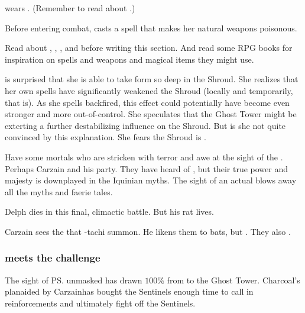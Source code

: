 \Nzessuacrith{} wears . 
(Remember to read about .)

Before entering combat, \Nzessuacrith{} casts a spell that makes her natural weapons poisonous. 

Read about , , ,  and  before writing this section. 
And read some RPG books for inspiration on spells and weapons and magical items they might use. 

\Nzessuacrith{} is surprised that she is able to take \draconic{} form so deep in the Shroud. 
She realizes that her own \EreshKali spells have significantly weakened the Shroud (locally and temporarily, that is).
As she spells backfired, this effect could potentially have become even stronger and more out-of-control. 
She speculates that the Ghost Tower might be exterting a further destabilizing influence on the Shroud. 
But is she not quite convinced by this explanation. 
She fears the Shroud is . 

\begin{prose}
\end{prose}

Have some mortals who are stricken with terror and awe at the sight of the \dragon{}. 
Perhaps Carzain and his party. 
They have heard  of \dragons, but their true power and majesty is downplayed in the Iquinian myths. 
The sight of an actual \dragon{} blows away all the myths and faerie tales. 

Delph dies in this final, climactic battle. 
But his rat lives.

Carzain sees the  that \Achsah-tachi summon. 
He likens them to bats, but . 
They also . 






\subsubsection{\Achsah meets the challenge}
The sight of \ps{\Nzessuacrith}{} unmasked has drawn \Achsah{} $100\%$ from \Malcur to the Ghost Tower. 
Charcoal's plan\dash aided by Carzain\dash has bought the Sentinels enough time to call in reinforcements and ultimately fight off the Sentinels. 

